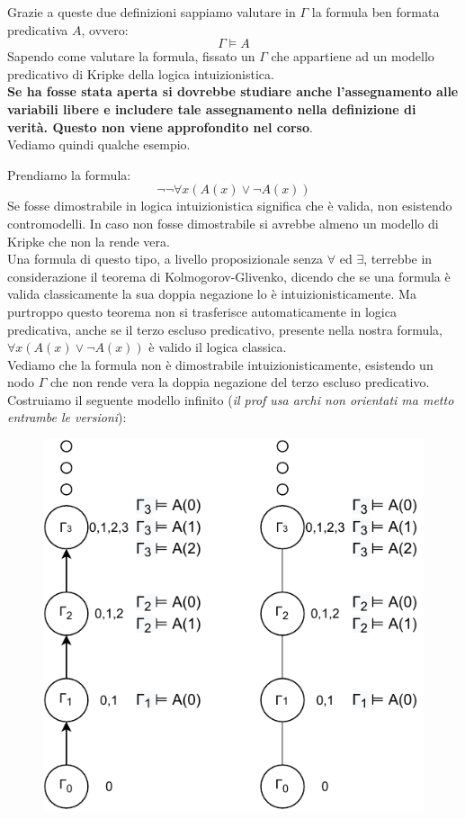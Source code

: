 \documentclass[a4paper,12pt, oneside]{book}
\begin{document}
Grazie a queste due definizioni sappiamo valutare in $\Gamma$ la formula ben
formata predicativa $A$, ovvero:
\[\Gamma\vDash A\]
Sapendo come valutare la formula, fissato un $\Gamma$ che appartiene ad un
modello predicativo di Kripke della logica intuizionistica.\\
\textbf{Se ha fosse stata aperta si dovrebbe studiare anche l'assegnamento alle
  variabili libere e includere tale assegnamento nella definizione di
  verità. Questo non viene approfondito nel corso}.\\
Vediamo quindi qualche esempio.
\begin{esempio}
  Prendiamo la formula:
  \[\neg\neg\forall x(A(x)\lor \neg A(x))\]
  Se fosse dimostrabile in logica intuizionistica significa che è valida, non
  esistendo contromodelli. In caso non fosse dimostrabile si avrebbe almeno un
  modello di Kripke che non la rende vera.\\
  Una formula di questo tipo, a livello proposizionale senza $\forall$ ed
  $\exists$, terrebbe in considerazione il teorema
  di Kolmogorov-Glivenko, dicendo che se una formula è valida classicamente la
  sua doppia negazione lo è intuizionisticamente. Ma purtroppo questo teorema
  non si trasferisce automaticamente in logica predicativa, anche se il terzo
  escluso predicativo, presente nella nostra formula, $\forall x(A(x)\lor \neg
  A(x))$ è valido il logica classica. \\
  Vediamo che la formula non è dimostrabile intuizionisticamente, esistendo un
  nodo $\Gamma$ che non rende vera la doppia negazione del terzo escluso
  predicativo. \\
  Costruiamo il seguente modello infinito (\textit{il prof usa archi non
    orientati ma metto entrambe le versioni}):
   \begin{figure}[H]
    \centering
    \includegraphics[scale = 0.9]{img/k5.pdf}

\end{figure}
\end{esempio}
\end{document}
